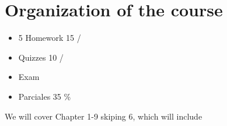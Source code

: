 \section{Organization of the course}
\begin{itemize}
	\item 5 Homework 15 /%
	\item Quizzes 10 /%
	\item Exam 
	\item Parciales 35 \%
\end{itemize}

We will cover Chapter 1-9 skiping 6, which will include 
